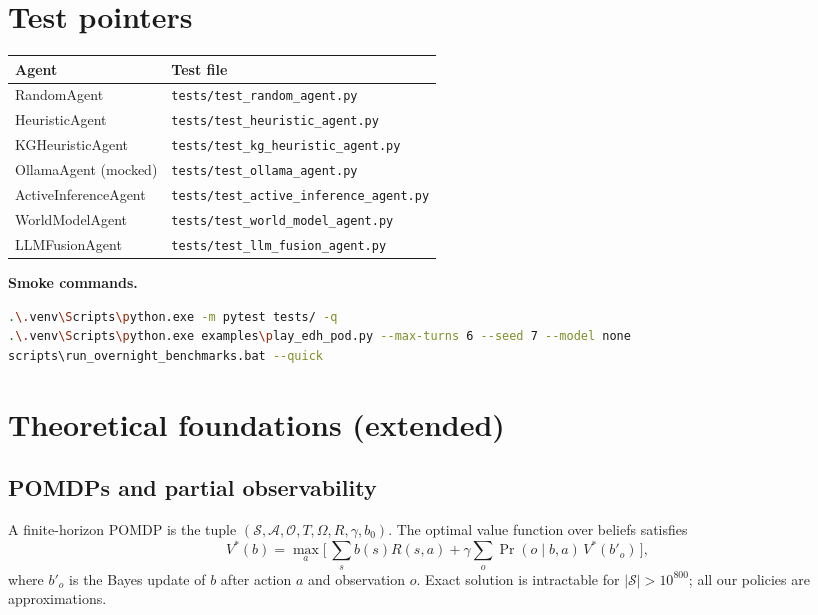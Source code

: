 \documentclass[11pt,a4paper]{article}
\begin{document}
\section{Test pointers}

\begin{table}[h]\centering\small
\begin{tabular}{ll}
\toprule
Agent & Test file \\
\midrule
RandomAgent           & \texttt{tests/test\_random\_agent.py}            \\
HeuristicAgent        & \texttt{tests/test\_heuristic\_agent.py}         \\
KGHeuristicAgent      & \texttt{tests/test\_kg\_heuristic\_agent.py}     \\
OllamaAgent (mocked)  & \texttt{tests/test\_ollama\_agent.py}            \\
ActiveInferenceAgent  & \texttt{tests/test\_active\_inference\_agent.py} \\
WorldModelAgent       & \texttt{tests/test\_world\_model\_agent.py}      \\
LLMFusionAgent        & \texttt{tests/test\_llm\_fusion\_agent.py}       \\
\bottomrule
\end{tabular}\end{table}

\medskip\noindent\textbf{Smoke commands.}
\begin{lstlisting}[language=bash]
.\.venv\Scripts\python.exe -m pytest tests/ -q
.\.venv\Scripts\python.exe examples\play_edh_pod.py --max-turns 6 --seed 7 --model none
scripts\run_overnight_benchmarks.bat --quick
\end{lstlisting}

\section{Theoretical foundations (extended)}
\label{sec:tech-foundations}

\subsection{POMDPs and partial observability}
A finite-horizon POMDP is the tuple
$(\mathcal{S},\mathcal{A},\mathcal{O},T,\Omega,R,\gamma,b_0)$.  The
optimal value function over beliefs satisfies
%
\begin{equation}
V^*(b) = \max_a \Big[\,
   \sum_s b(s) R(s,a)
   + \gamma \sum_o \Pr(o\mid b,a)\, V^*(b'_o)
\,\Big],
\end{equation}
%
where $b'_o$ is the Bayes update of $b$ after action $a$ and observation
$o$.  Exact solution is intractable for $|\mathcal{S}| > 10^{800}$;
all our policies are approximations.
\end{document}
